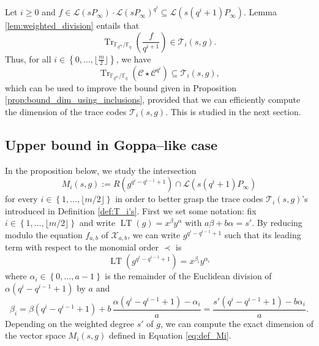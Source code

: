 \documentclass[a4paper]{amsart}
\theoremstyle{definition}
\theoremstyle{remark}
\newcommand{\calL}{\mathcal{L}}
\newcommand{\calC}{\mathcal{C}}
\newcommand{\calT}{\mathcal{T}}
\newcommand{\calX}{\mathcal{X}}
\newcommand{\fq}{\mathbb{F}_{q}}
\newcommand{\Tr}[1]{\operatorname{Tr}_{\mathbb{F}_{q^m}/\fq}\left(#1\right)}
\newcommand{\set}[1]{\left\{#1\right\}}
\newcommand{\LT}[1]{\operatorname{LT}\left(#1\right)}
\begin{document}
\noindent Let $i \geq 0$ and $f \in \calL(sP_\infty) \cdot \calL(sP_\infty)^{q^i} \subseteq \calL(s(q^i+1)P_\infty)$. Lemma \ref{lem:weighted_division} entails that 
$$\Tr{\dfrac{f}{q^{i+1}}} \in \calT_i(s,g).$$
Thus, for all $i \in \set{0,\dots,\lfloor \frac{m}{2} \rfloor}$, we have \begin{equation} \label{eq:Tr(C*C^q^i)_dans_T_i}
\Tr{\calC \star \calC^{q^i}} \subseteq \calT_i(s,g),
\end{equation}
which can be used to improve the bound given in Proposition \ref{prop:bound_dim_using_inclusions}, provided that we can efficiently compute the dimension of the trace codes $\calT_i(s,g)$. This is studied in the next section.
\subsection{Upper bound in Goppa--like case}
In the proposition below, we study the intersection 
\begin{equation}\label{eq:def_Mi}
M_i(s,g):=R\left(g^{q^{i}-q^{i-1}+1}\right) \cap \calL(s(q^i+1)P_\infty)
\end{equation}
for every $i \in \set{1,\dots,\lfloor m/2 \rfloor}$ in order to better grasp the trace codes $\calT_i(s,g)$'s introduced in Definition \ref{def:T_i's}.
First we set some notation: fix $i \in \set{1,\dots,\lfloor m/2 \rfloor}$ and write $\LT{g}=x^\beta y^\alpha$ with $a\beta + b\alpha=s'$. By reducing modulo the equation $f_{a,b}$ of $\calX_{a,b}$, we can write $g^{q^i-q^{i-1}+1}$ such that its leading term with respect to the monomial order $\prec$ is
\begin{equation}\label{eq:gi}
 \LT{g^{q^i-q^{i-1}+1}}=x^{\beta_i} y^{\alpha_i}
\end{equation}
 where $\alpha_i \in \set{0,\dots,a-1}$ is the remainder of the Euclidean division of $\alpha (q^i-q^{i-1}+1)$ by $a$ and 
 \begin{equation}\label{eq:value_beta_prime}
  \beta_i=\beta(q^i-q^{i-1}+1) + b \, \frac{\alpha(q^i-q^{i-1}+1)-\alpha_i}{a}= \frac{s'(q^i-q^{i-1}+1)-b\alpha_i}{a}.
 \end{equation}
%
Depending on the weighted degree $s'$ of $g$, we can compute the exact dimension of the vector space $M_i(s,g)$ defined in Equation \eqref{eq:def_Mi}.
\end{document}
